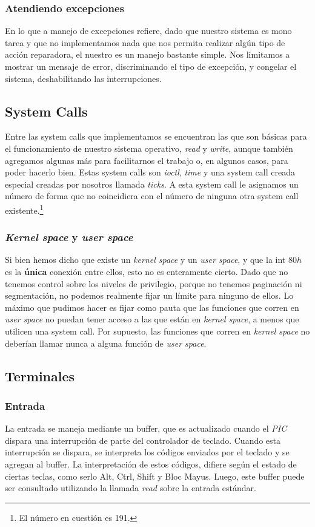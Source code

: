 \documentclass[a4paper,10pt]{article}
\begin{document}
	\subsubsection{Atendiendo excepciones}
	    En lo que a manejo de excepciones refiere, dado que nuestro sistema es mono tarea y que no implementamos nada que nos permita realizar algún tipo de acción 
	    reparadora, el nuestro es un manejo bastante simple. Nos limitamos a mostrar un mensaje de error, discriminando el tipo de excepción, y congelar el sistema,
	    deshabilitando las interrupciones.

    \subsection{System Calls}
	    Entre las system calls que implementamos se encuentran las que son básicas para el funcionamiento de nuestro sistema operativo, \textit{read} y \textit{write},
	    aunque también agregamos algunas más para facilitarnos el trabajo o, en algunos casos, para poder hacerlo bien. Estas system calls son \textit{ioctl}, 
	    \textit{time} y una system call creada especial creadas por nosotros llamada \textit{ticks}. A esta system call le asignamos un número de forma que no 
	    coincidiera con el número de ninguna otra system call existente.\footnote{El número en cuestión es 191.}
	
	\subsubsection{\textit{Kernel space} y \textit{user space}}
	    Si bien hemos dicho que existe un \textit{kernel space} y un \textit{user space}, y que la int $80h$ es la \textbf{única} conexión entre ellos, esto no es 
	    enteramente cierto. Dado que no tenemos control sobre los niveles de privilegio, porque no tenemos paginación ni segmentación, no podemos realmente fijar un
	    límite para ninguno de ellos. Lo máximo que pudimos hacer es fijar como pauta que las funciones que corren en \textit{user space} no puedan tener acceso a
	    las que están en \textit{kernel space}, a menos que utilicen una system call. Por supuesto, las funciones que corren en \textit{kernel space} no deberían 
	    llamar nunca a alguna función de \textit{user space}.

    \subsection{Terminales}
        \subsubsection{Entrada}
            La entrada se maneja mediante un buffer, que es actualizado cuando el \textit{PIC} dispara una interrupción de parte del controlador de teclado.
            Cuando esta interrupción se dispara, se interpreta los códigos enviados por el teclado y se agregan al buffer.
            La interpretación de estos códigos, difiere según el estado de ciertas teclas, como serlo Alt, Ctrl, Shift y Bloc Mayus.
            Luego, este buffer puede ser consultado utilizando la llamada \textit{read} sobre la entrada estándar.
\end{document}
